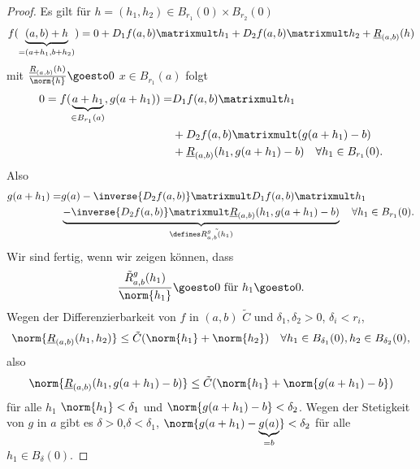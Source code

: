\begin{proof}
  Es gilt für \( h=(h_1,h_2)\in B_{r_1}(0)\times B_{r_2}(0) \)
  \begin{equation*}
    f(\underbrace{(a,b)+h}_{=(a+h_1,b+h_2)})=0+D_1f(a,b)\matrixmult h_1+D_2 f(a,b)\matrixmult h_2+\underline{R}_{(a,b)}(h)
  \end{equation*}
  mit \( \frac{\underline{R}_{(a,b)}(h)}{\norm{h}}\goesto 0 \) \tforall \( x\in B_{r_1}(a) \) folgt
  \begin{equation*}
    \begin{split}
      0=f(\underbrace{a+h_1}_{\in B_{r_1}(a)},g(a+h_1))=&D_1 f(a,b)\matrixmult h_1\\
      &+D_2 f(a,b)\matrixmult (g(a+h_1)-b)\\
      &+\underline{R}_{(a,b)}(h_1,g(a+h_1)-b)\quad \forall h_1\in B_{r_1}(0).
    \end{split}
  \end{equation*}
  Also
  \begin{equation*}
    \begin{split}
      g(a+h_1)=&g(a)-\inverse{D_2f(a,b)}\matrixmult D_1 f(a,b)\matrixmult h_1\\
      &\underbrace{-\inverse{D_2f(a,b)}\matrixmult \underline{R}_{(a,b)}(h_1,g(a+h_1)-b)}_{\defines \tilde{R_{a,b}^g(h_1)}}\quad \forall h_1\in B_{r_1}(0).
    \end{split}
  \end{equation*}
  Wir sind fertig, wenn wir zeigen können, dass
  \begin{equation*}
    \frac{\tilde{R}_{a,b}^g(h_1)}{\norm{h_1}}\goesto 0 \text{ für }h_1\goesto 0.
  \end{equation*}
  Wegen der Differenzierbarkeit von \( f \) in \( (a,b) \) \texists  \( \tilde{C} \) und \( \delta_1,\delta_2>0 \), \( \delta_i<r_i \), \sd
  \begin{equation*}
    \norm{\underline{R}_{(a,b)}(h_1,h_2)}\leq \tilde{C}(\norm{h_1}+\norm{h_2})\quad \forall h_1\in B_{\delta_1}(0), h_2\in B_{\delta_2}(0),
  \end{equation*}
  also
  \begin{equation*}
    \norm{\underline{R}_{(a,b)}(h_1,g(a+h_1)-b)}\leq \tilde{C}(\norm{h_1}+\norm{g(a+h_1)-b})
  \end{equation*}
  für alle \( h_1 \) \sd \( \norm{h_1}<\delta_1 \) und \( \norm{g(a+h_1)-b}<\delta_2 \). Wegen der Stetigkeit von \( g \) in \( a \) gibt es \( \delta>0 \),\( \delta<\delta_1 \), \( \norm{g(a+h_1)-\underbrace{g(a)}_{=b}}<\delta_2 \) für alle \( h_1\in B_{\delta}(0) \).
\end{proof}
